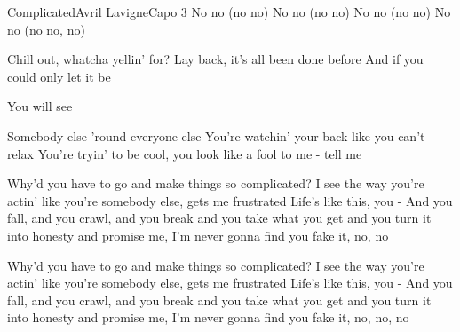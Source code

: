 \begin{song}{Complicated}{Avril Lavigne}{Capo 3}
No no (no no) No no (no no)
No no (no no) No no (no no, no)

Chill out, whatcha yellin' for? Lay back, it's all been done before
  And if you could only let it be

You will see

Somebody else 'round everyone else
You're watchin' your back like you can't relax
You're tryin' to be cool, you look like a fool to me - tell me

Why'd you have to go and make things so complicated? I see the way you're
actin' like you're somebody else, gets me frustrated
Life's like this, you - And you fall, and you crawl, and you break
and you take what you get and you turn it into honesty
and promise me, I'm never gonna find you fake it, no, no


Why'd you have to go and make things so complicated? I see the way you're
actin' like you're somebody else, gets me frustrated
Life's like this, you - And you fall, and you crawl, and you break
and you take what you get and you turn it into honesty
and promise me, I'm never gonna find you fake it, no, no, no
\end{song}

